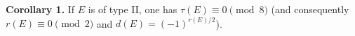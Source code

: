 \textbf{Corollary 1.} If $E$ is of type II, one has $\tau(E) \equiv 0 \pmod{8}$ (and consequently $r(E) \equiv 0 \pmod{2}$ and $d(E) = (-1)^{r(E)/2}$).

